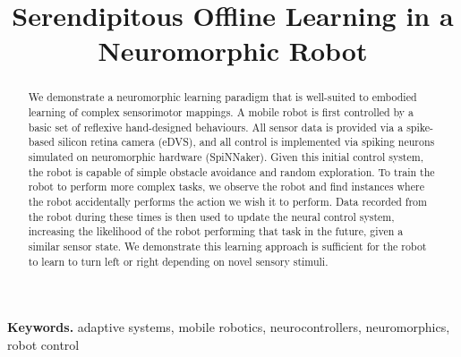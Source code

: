 \documentclass[conference]{IEEEtran}
\begin{document}
%
\title{Serendipitous Offline Learning in a Neuromorphic Robot}



% 
\author{
}


\maketitle


\begin{abstract}
We demonstrate a neuromorphic learning paradigm that is well-suited to embodied learning of complex sensorimotor mappings. A mobile robot is first controlled by a basic set of reflexive hand-designed behaviours. All sensor data is provided via a spike-based silicon retina camera (eDVS), and all control is implemented via spiking neurons simulated on neuromorphic hardware (SpiNNaker). Given this initial control system, the robot is capable of simple obstacle avoidance and random exploration. To train the robot to perform more complex tasks, we observe the robot and find instances where the robot accidentally performs the action we wish it to perform. Data recorded from the robot during these times is then used to update the neural control system, increasing the likelihood of the robot performing that task in the future, given a similar sensor state. We demonstrate this learning approach is sufficient for the robot to learn to turn left or right depending on novel sensory stimuli.

\end{abstract}
\medskip
\noindent \textbf{Keywords.} adaptive systems, mobile robotics, neurocontrollers, neuromorphics, robot control
\end{document}
